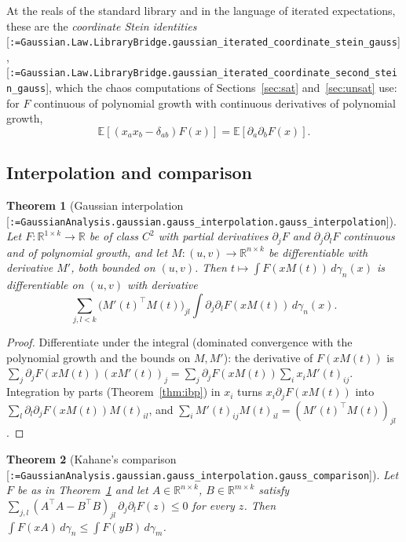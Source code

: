 \documentclass[11pt]{article}
\makeatletter
\newcommand{\formal@break}[1]{\@tfor\formal@tok:=#1\do{%
  \formal@tok
  \expandafter\ifx\formal@tok.\allowbreak\else
  \expandafter\ifx\formal@tok\_\allowbreak\fi\fi}}
\DeclareRobustCommand{\formal}[1]{\textnormal{[\texttt{\small\formal@break{#1}}]}}
\newcommand{\R}{\mathbb{R}}
\newcommand{\E}{\mathbb{E}}
\newcommand{\gauss}{\gamma}
\theoremstyle{plain}
\newtheorem{theorem}{Theorem}[section]
\theoremstyle{definition}
\makeatother
\begin{document}
At the reals of the standard library and in the language of iterated
expectations, these are the \emph{coordinate Stein identities}
\formal{Gaussian.Law.LibraryBridge.gaussian\_iterated\_coordinate\_stein\_gauss},
\formal{Gaussian.Law.LibraryBridge.gaussian\_iterated\_coordinate\_second\_stein\_gauss},
which the chaos computations of Sections~\ref{sec:sat} and~\ref{sec:unsat}
use: for $F$ continuous of polynomial growth with continuous derivatives of
polynomial growth,
\[
\E[(x_a x_b - \delta_{ab}) F(x)] = \E[\partial_a \partial_b F(x)] .
\]

\subsection{Interpolation and comparison}\label{sec:comparison}

\begin{theorem}[Gaussian interpolation \formal{GaussianAnalysis.gaussian.gauss\_interpolation.gauss\_interpolation}]\label{thm:interp}
Let $F : \R^{1\times k} \to \R$ be of class $C^2$ with partial derivatives
$\partial_j F$ and $\partial_j \partial_l F$ continuous and of polynomial
growth, and let $M : (u, v) \to \R^{n\times k}$ be differentiable with
derivative $M'$, both bounded on $(u, v)$. Then $t \mapsto \int F(xM(t))\, d\gauss_n(x)$
is differentiable on $(u, v)$ with derivative
\[
\sum_{j, l < k} \bigl(M'(t)^{\top} M(t)\bigr)_{jl} \int \partial_j \partial_l F(xM(t))\, d\gauss_n(x) .
\]
\end{theorem}

\begin{proof}
Differentiate under the integral (dominated convergence with the
polynomial growth and the bounds on $M, M'$): the derivative of
$F(xM(t))$ is $\sum_j \partial_j F(xM(t)) (xM'(t))_j = \sum_j \partial_j F(xM(t)) \sum_i x_i M'(t)_{ij}$.
Integration by parts (Theorem~\ref{thm:ibp}) in $x_i$ turns
$x_i \partial_j F(xM(t))$ into $\sum_l \partial_l \partial_j F(xM(t)) M(t)_{il}$,
and $\sum_i M'(t)_{ij} M(t)_{il} = (M'(t)^{\top} M(t))_{jl}$.
\end{proof}

\begin{theorem}[Kahane's comparison \formal{GaussianAnalysis.gaussian.gauss\_interpolation.gauss\_comparison}]\label{thm:kahane}
Let $F$ be as in Theorem~\ref{thm:interp} and let $A \in \R^{n \times k}$,
$B \in \R^{m \times k}$ satisfy
$\sum_{j,l} (A^{\top} A - B^{\top} B)_{jl}\, \partial_j \partial_l F(z) \le 0$
for every $z$. Then $\int F(xA)\, d\gauss_n \le \int F(yB)\, d\gauss_m$.
\end{theorem}
\end{document}
